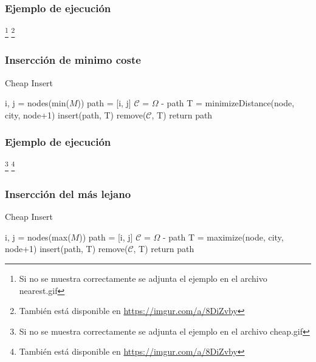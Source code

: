 \documentclass[spanish]{beamer}
\begin{document}
\begin{frame}\frametitle{Ejemplo de ejecución}
  \footnote[1]{Si no se muestra correctamente se adjunta el ejemplo en el archivo nearest.gif}
  \footnote[2]{También está disponible en \href{https://imgur.com/a/8DiZvby}{https://imgur.com/a/8DiZvby}}
\end{frame}

\begin{frame}\frametitle{Insercción de minimo coste}
  \begin{algorithm}[H]
    \caption{Cheap Insert}
    \begin{algorithmic}
      \State i, j = nodes(min($M$))
      \State path = [i, j]
      \State $\mathcal{C}$ = $\Omega$ - path
      \State T = minimizeDistance(node, city, node+1)
      \EndFor
      \State insert(path, T)
      \State remove($\mathcal{C}$, T)
      \EndIf
      \EndFor
      \EndWhile
      \State return path
    \end{algorithmic}
  \end{algorithm}
  
\end{frame}

\begin{frame}\frametitle{Ejemplo de ejecución}
  \footnote[1]{Si no se muestra correctamente se adjunta el ejemplo en el archivo cheap.gif}
  \footnote[2]{También está disponible en \href{https://imgur.com/a/8DiZvby}{https://imgur.com/a/8DiZvby}}
\end{frame}

\begin{frame}\frametitle{Insercción del más lejano}
  \begin{algorithm}[H]
    \caption{Cheap Insert}
    \begin{algorithmic}
      \State i, j = nodes(max($M$))
      \State path = [i, j]
      \State $\mathcal{C}$ = $\Omega$ - path
      \State T = maximize(node, city, node+1)
      \EndFor
      \State insert(path, T)
      \State remove($\mathcal{C}$, T)
      \EndIf
      \EndFor
      \EndWhile
      \State return path
    \end{algorithmic}
  \end{algorithm}
\end{frame}
\end{document}
